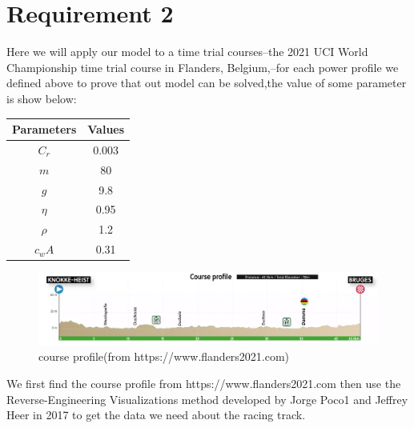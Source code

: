 \documentclass[12pt]{article}
\begin{document}
\section{Requirement 2}
Here we will apply our model to a time trial courses--the 2021 UCI World Championship time trial course in Flanders, Belgium,--for each power profile we defined
above to prove that out model can be solved,the value of some parameter is show below:
\begin{tabular}{|c |c|}\hline
    \bf Parameters & \bf Values \\\hline
    $C_r$          & 0.003      \\\hline
    $m$            & 80         \\\hline
    $g$            & 9.8        \\\hline
    $\eta $        & 0.95       \\\hline
    $\rho  $       & 1.2        \\\hline
    $c_wA$         & 0.31       \\\hline
\end{tabular}
\begin{figure}
    \centering
    \includegraphics[width=1\columnwidth]{men-elite-individual-time-trial}
    \caption{course profile(from https://www.flanders2021.com)}
\end{figure}
We first find the course profile from https://www.flanders2021.com
then use the Reverse-Engineering Visualizations method developed by Jorge Poco1 and Jeffrey Heer in 2017\cite{poco2017reverse} to get the data we need about the racing track.
\end{document}
